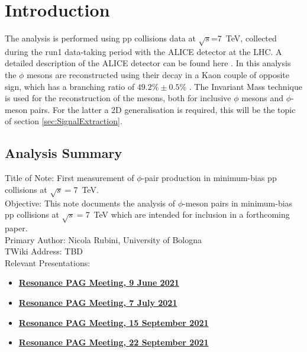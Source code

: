 \section{Introduction}
\label{sec:Introduction}
The analysis is performed using pp collisions data at $\sqrt{s}$=\SI{7}{\tera\electronvolt}, collected during the run1 data-taking period with the ALICE detector at the LHC. A detailed description of the ALICE detector can be found here \cite{Collaboration_2008}. In this analysis the $\phi$ mesons are reconstructed using their decay in a Kaon couple of opposite sign, which has a branching ratio of $49.2\%\pm 0.5\%$ \cite{PDG}. The Invariant Mass technique is used for the reconstruction of the mesons, both for inclusive $\phi$ mesons and $\phi$-meson pairs. For the latter a 2D generalisation is required, this will be the topic of section \ref{sec:SignalExtraction}.\\

\subsection{Analysis Summary}
Title of Note: First measurement of $\phi$-pair production in minimum-bias pp collisions at $\sqrt{s}=$\SI{7}{\tera\electronvolt}.\\
Objective: This note documents the analysis of $\phi$-meson pairs in minimum-bias pp collisions at $\sqrt{s}=$\SI{7}{\tera\electronvolt} which are intended for inclusion in a forthcoming paper.\\
Primary Author: Nicola Rubini, University of Bologna\\
TWiki Address: TBD\\
Relevant Presentations:
\begin{itemize}
\item \href{https://indico.cern.ch/event/1046617/}{\bf{Resonance PAG Meeting, 9 June 2021}}
\item \href{https://indico.cern.ch/event/1052315/}{\bf{Resonance PAG Meeting, 7 July 2021}}
\item \href{https://indico.cern.ch/event/1074274/}{\bf{Resonance PAG Meeting, 15 September 2021}}
\item \href{https://indico.cern.ch/event/1079015/}{\bf{Resonance PAG Meeting, 22 September 2021}}
\end{itemize}

